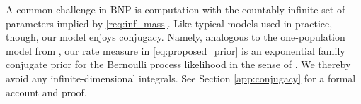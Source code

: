 A common challenge in BNP is computation with the countably infinite set of parameters implied by \cref{req:inf_mass}.
Like typical models used in practice, though, our model enjoys conjugacy. Namely, analogous to the one-population model from \citet{Masoero2022}, our rate measure in \cref{eq:proposed_prior} is an exponential family conjugate prior for the Bernoulli process likelihood in the sense of \citet{Broderick2018}. We thereby avoid any infinite-dimensional integrals. See Section \cref{app:conjugacy} for a formal account and proof. 

